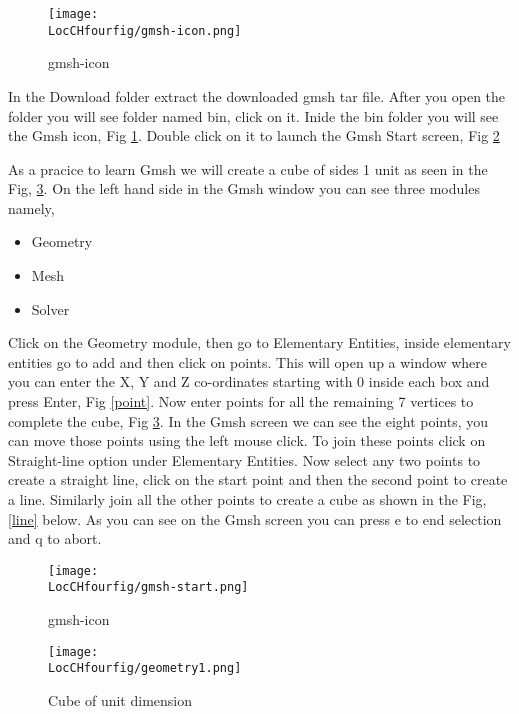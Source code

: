 \begin{figure}[ht]  
\begin{center}  
\texttt{[image: \\LocCHfourfig/gmsh-icon.png]}
\caption{gmsh-icon}
\label{gmsh-icon}
\end{center}  
\end{figure}


\flushleft In the Download folder extract the downloaded gmsh tar file. After you open the folder you will see folder named bin, click on it. 
Inide the bin folder you will see the Gmsh icon, Fig \ref{gmsh-icon}. Double click on it to launch the Gmsh Start screen, Fig \ref{gmsh-start} \newline

As a pracice to learn Gmsh we will create a cube of sides 1 unit as seen in the Fig, \ref{geometry1}. On the left hand side in the Gmsh window you can 
see three modules namely,

\begin{itemize}
\item Geometry
\item Mesh
\item Solver
\end{itemize}

Click on the Geometry module, then go to Elementary Entities, inside elementary entities go to add and then click on points. This will open up a
window where you can enter the X, Y and Z co-ordinates starting with 0 inside each box and press Enter, Fig \ref{point}. Now
enter points for all the remaining 7 vertices to complete the cube, Fig \ref{geometry1}. In the Gmsh screen we can see the eight points, you can move those points
using the left mouse click. To join these points click on Straight-line option under Elementary Entities. Now select any two points to create a straight line, click 
on the start point and then the second point to create a line. Similarly join all the other points to create a cube as shown in the Fig, \ref{line} below.
As you can see on the Gmsh screen you can press e to end selection and q to abort.

\begin{figure}[t]  
\begin{center}  
\texttt{[image: \\LocCHfourfig/gmsh-start.png]}
\caption{gmsh-icon}
\label{gmsh-start}
\end{center}  
\end{figure}

\begin{figure}[t]  
\begin{center}  
\texttt{[image: \\LocCHfourfig/geometry1.png]}
\caption{Cube of unit dimension}
\label{geometry1}
\end{center}  
\end{figure}

